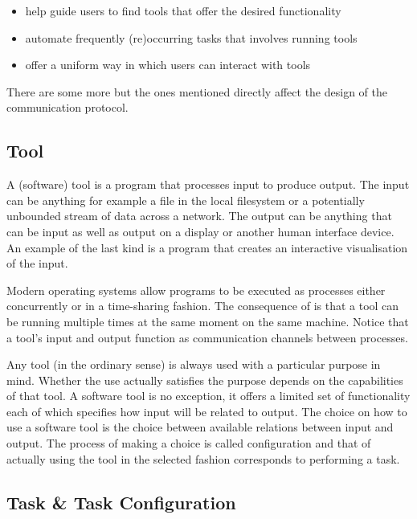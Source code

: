 \documentclass{article}
\begin{document}
    \begin{itemize}
     \item help guide users to find tools that offer the desired functionality
     \item automate frequently (re)occurring tasks that involves running tools
     \item offer a uniform way in which users can interact with tools
    \end{itemize}

   There are some more but the ones mentioned directly affect the design of the
   communication protocol.

  \subsection{Tool}

   A (software) tool is a program that processes input to produce output. The
   input can be anything for example a file in the local filesystem or a
   potentially unbounded stream of data across a network. The output can be
   anything that can be input as well as output on a display or another human
   interface device. An example of the last kind is a program that creates an
   interactive visualisation of the input.
   
   Modern operating systems allow programs to be executed as processes either
   concurrently or in a time-sharing fashion. The consequence of is that a tool
   can be running multiple times at the same moment on the same machine. Notice
   that a tool's input and output function as communication channels between
   processes. %

   Any tool (in the ordinary sense) is always used with a particular purpose in
   mind. Whether the use actually satisfies the purpose depends on the
   capabilities of that tool. A software tool is no exception, it offers a
   limited set of functionality each of which specifies how input will be
   related to output.  The choice on how to use a software tool is the choice
   between available relations between input and output.  The process of making
   a choice is called configuration and that of actually using the tool in the
   selected fashion corresponds to performing a task.

  \subsection{Task \& Task Configuration} \label{concepts::task_configuration}
\end{document}
